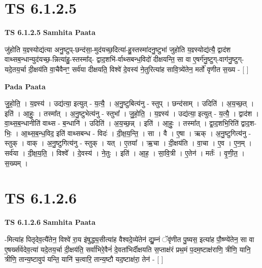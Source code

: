 \documentclass[17pt]{extarticle}
\begin{document}

\section{ TS 6.1.2.5 }

\textbf{TS 6.1.2.5 } \newline
\textbf{Samhita Paata} \newline

जु॑होति य॒ज्ञ्स्योद्य॑त्या अनु॒ष्टुप्-छन्द॑सा॒-मुद॑यच्छ॒दित्या॑-हु॒स्तस्मा॑दनु॒ष्टुभा॑ जुहोति य॒ज्ञ्स्योद्य॑त्यै॒ द्वाद॑श वाथ्सब॒न्धान्युद॑यच्छ॒-न्नित्या॑हु॒-स्तस्मा᳚द्- द्वाद॒शभि॑-र्वाथ्सबन्ध॒विदो॑ दीक्षयन्ति॒ सा वा ए॒षर्ग॑नु॒ष्टुग्-वाग॑नु॒ष्टुग्-यदे॒तय॒र्चा दी॒क्षय॑ति वा॒चैवैनꣳ॒॒ सर्व॑या दीक्षयति॒ विश्वे॑ दे॒वस्य॑ ने॒तुरित्या॑ह सावि॒त्र्ये॑तेन॒ मर्तो॑ वृणीत स॒ख्य - [  ] \newline

\textbf{Pada Paata} \newline

जु॒हो॒ति॒ । य॒ज्ञ्स्य॑ । उद्य॑त्या॒ इत्युत् - य॒त्यै॒ । अ॒नु॒ष्टुबित्य॑नु - स्तुप् । छन्द॑साम् । उदिति॑ । अ॒य॒च्छ॒त् । इति॑ । आ॒हुः॒ । तस्मा᳚त् । अ॒नु॒ष्टुभेत्य॑नु - स्तुभा᳚ । जु॒हो॒ति॒ । य॒ज्ञ्स्य॑ । उद्य॑त्या॒ इत्युत् - य॒त्यै॒ । द्वाद॑श । वा॒थ्स॒ब॒न्धानीति॑ वाथ्स - ब॒न्धानि॑ । उदिति॑ । अ॒य॒च्छ॒न्न् । इति॑ । आ॒हुः॒ । तस्मा᳚त् । द्वा॒द॒शभि॒रिति॑ द्वाद॒श-भिः॒ । आ॒थ्स॒ब॒न्ध॒विद॒ इति॑ वाथ्सबन्ध - विदः॑ । दी॒क्ष॒य॒न्ति॒ । सा । वै । ए॒षा । ऋक् । अ॒नु॒ष्टुगित्य॑नु - स्तुक् । वाक् । अ॒नु॒ष्टुगित्य॑नु - स्तुक् । यत् । ए॒तया᳚ । ऋ॒चा । दी॒क्षय॑ति । वा॒चा । ए॒व । ए॒न॒म् । सर्व॑या । दी॒क्ष॒य॒ति॒ । विश्वे᳚ । दे॒वस्य॑ । ने॒तुः । इति॑ । आ॒ह॒ । सा॒वि॒त्री । ए॒तेन॑ । मर्तः॑ । वृ॒णी॒त॒ । स॒ख्यम् ।  \newline





\section{ TS 6.1.2.6 }

\textbf{TS 6.1.2.6 } \newline
\textbf{Samhita Paata} \newline

-मित्या॑ह पितृदेव॒त्यै॑तेन॒ विश्वे॑ रा॒य इ॑षुद्ध्य॒सीत्या॑ह वैश्वदे॒व्ये॑तेन॑ द्यु॒म्नं ॅवृ॑णीत पु॒ष्यस॒ इत्या॑ह पौ॒ष्ण्ये॑तेन॒ सा वा ए॒षर्ख्स॑र्वदेव॒त्या॑ यदे॒तय॒र्चा दी॒क्षय॑ति॒ सर्वा॑भिरे॒वैनं॑ दे॒वता॑भिर्दीक्षयति स॒प्ताक्ष॑रं प्रथ॒मं प॒दम॒ष्टाक्ष॑राणि॒ त्रीणि॒ यानि॒ त्रीणि॒ तान्य॒ष्टावुप॑ यन्ति॒ यानि॑ च॒त्वारि॒ तान्य॒ष्टौ यद॒ष्टाक्ष॑रा॒ तेन॑ - [  ] \newline
\end{document}
